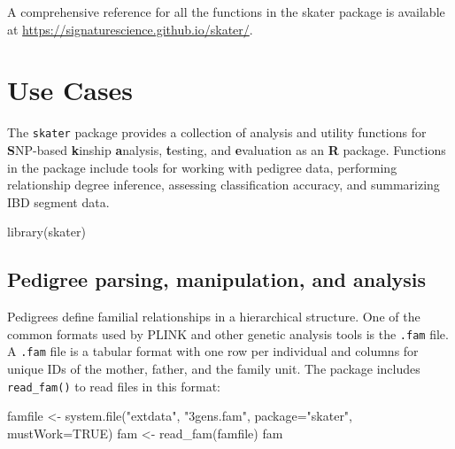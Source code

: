 \documentclass[9pt,a4paper,]{extarticle}
\newenvironment{Shaded}{\begin{snugshade}}{\end{snugshade}}
\newcommand{\AttributeTok}[1]{\textcolor[rgb]{0.77,0.63,0.00}{#1}}
\newcommand{\ConstantTok}[1]{\textcolor[rgb]{0.00,0.00,0.00}{#1}}
\newcommand{\FunctionTok}[1]{\textcolor[rgb]{0.00,0.00,0.00}{#1}}
\newcommand{\NormalTok}[1]{#1}
\newcommand{\OtherTok}[1]{\textcolor[rgb]{0.56,0.35,0.01}{#1}}
\newcommand{\StringTok}[1]{\textcolor[rgb]{0.31,0.60,0.02}{#1}}
\begin{document}
A comprehensive reference for all the functions in the skater package is available at \url{https://signaturescience.github.io/skater/}.

\hypertarget{use-cases}{%
\section{Use Cases}\label{use-cases}}

The \texttt{skater} package provides a collection of analysis and utility functions for \textbf{S}NP-based \textbf{k}inship \textbf{a}nalysis, \textbf{t}esting, and \textbf{e}valuation as an \textbf{R} package. Functions in the package include tools for working with pedigree data, performing relationship degree inference, assessing classification accuracy, and summarizing IBD segment data.

\begin{Shaded}
\begin{Highlighting}[]
\FunctionTok{library}\NormalTok{(skater)}
\end{Highlighting}
\end{Shaded}

\hypertarget{pedigree-parsing-manipulation-and-analysis}{%
\subsection{Pedigree parsing, manipulation, and analysis}\label{pedigree-parsing-manipulation-and-analysis}}

Pedigrees define familial relationships in a hierarchical structure. One of the common formats used by PLINK \citep{purcell2007} and other genetic analysis tools is the \texttt{.fam} file. A \texttt{.fam} file is a tabular format with one row per individual and columns for unique IDs of the mother, father, and the family unit. The package includes \texttt{read\_fam()} to read files in this format:

\begin{Shaded}
\begin{Highlighting}[]
\NormalTok{famfile }\OtherTok{\textless{}{-}} \FunctionTok{system.file}\NormalTok{(}\StringTok{"extdata"}\NormalTok{, }\StringTok{"3gens.fam"}\NormalTok{, }\AttributeTok{package=}\StringTok{"skater"}\NormalTok{, }\AttributeTok{mustWork=}\ConstantTok{TRUE}\NormalTok{)}
\NormalTok{fam }\OtherTok{\textless{}{-}} \FunctionTok{read\_fam}\NormalTok{(famfile)}
\NormalTok{fam}
\end{Highlighting}
\end{Shaded}
\end{document}
